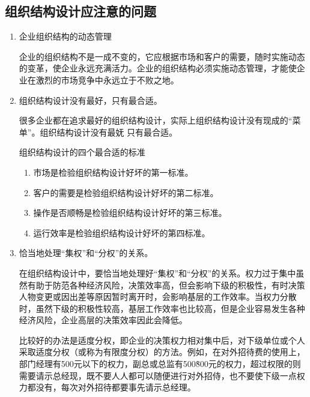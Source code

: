     \subsection {组织结构设计应注意的问题}

        \begin{enumerate}
            \item 企业组织结构的动态管理

            企业的组织结构不是一成不变的，它应根据市场和客户的需要，随时实施动态的变革，使企业永远充满活力。企业的组织结构必须实施动态管理，才能使企业在激烈的市场竞争中永远立于不败之地。

            \item 组织结构设计没有最好，只有最合适。

                很多企业都在追求最好的组织结构设计，实际上组织结构设计没有现成的“菜单”。组织结构设计没有最妩 只有最合适。

                组织结构设计的四个最合适的标准

                \begin{enumerate}
                    \item 市场是检验组织结构设计好坏的第一标准。

                    \item 客户的需要是检验组织结构设计好坏的第二标准。

                    \item 操作是否顺畅是检验组织结构设计好坏的第三标准。

                    \item 运行效率是检验组织结构设计好坏的第四标准。
                \end{enumerate}

            \item 恰当地处理“集权”和“分权”的关系。

            在组织结构设计中，要恰当地处理好“集权”和“分权”的关系。权力过于集中虽然有助于防范各种经济风险，决策效率高，但会影响下级的积极性，有时决策人物变更或因出差等原因暂时离开时，会影响基层的工作效率。当权力分散时，虽然下级的积极性较高，基层工作效率也比较高，但是企业容易发生各种经济风险，企业高层的决策效率因此会降低。

            比较好的办法是适度分权，即企业的决策权力相对集中后，对下级单位或个人采取适度分权（或称为有限度分权）的方法。例如，在对外招待费的使用上，部门经理有500元以下的权力，副总或总监有500\~800元的权力，超过权限的则需要请示总经现，既不要人人都可以随便进行对外招侍，也不要使下级一点权力都没有，每次对外招待都要事先请示总经理。
        \end{enumerate}


